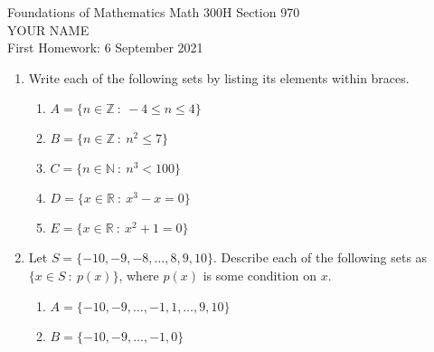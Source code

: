 \documentclass[12pt]{article}
\newcommand{\RR}{{\mathbb R}}  %
\newcommand{\sep}{{\ :\ }}     %
\begin{document}
\LARGE 
\noindent
{\color{Maroon}Foundations of Mathematics \hfill Math 300H Section 970}\vspace{2pt}\\
\Large YOUR NAME\vspace{2pt}\\
\large
First Homework: \hfill 6 September 2021
\normalsize\vspace{10pt}


\begin{enumerate}  %

\item Write each of the following sets by listing its elements within braces.
  \begin{enumerate}  %

  \item $A=\{n\in\mathbb{Z} \sep  -4\leq n\leq 4\}$

  \item $B=\{n\in{\mathbb Z} \sep  n^2\leq 7\}$

  \item $C=\{n\in{\mathbb N} \sep  n^3< 100\}$

  \item $D=\{x\in\RR \sep  x^3-x=0\}$
 
  \item $E=\{x\in\RR \sep  x^2+1=0\}$
     
  \end{enumerate}


\item Let $S=\{-10,-9,-8,\dotsc,8,9,10\}$.
  Describe each of the following sets as $\{x\in S \sep  p(x)\}$, where $p(x)$ is some condition on $x$.
  \begin{enumerate}  

  \item $A=\{-10,-9,\dotsc,-1,1,\ldots,9,10\}$  %

  \item $B=\{-10,-9,\dotsc,-1,0\}$


\end{enumerate}
\end{enumerate}
\end{document}
